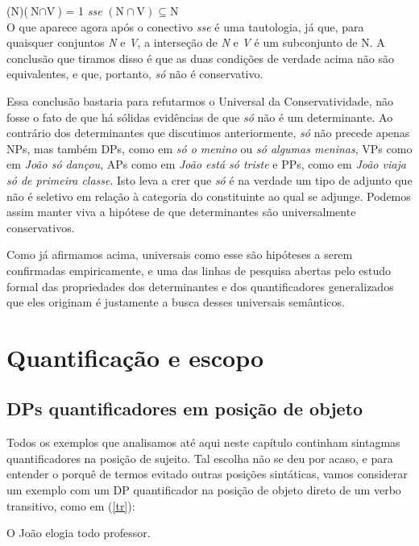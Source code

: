 \n {}(N)($\text{N}\cap\text{V}$) = 1 \textit{sse}
$(\text{N}\cap\text{V})\subseteq\text{N}$\\

\n O que aparece agora após o conectivo \textit{sse} é uma
tautologia, já que, para quaisquer conjuntos \textit{N} e
\textit{V}, a interseção de \textit{N} e \textit{V} é um
subconjunto de N. A conclusão que tiramos disso é que as duas
condições de verdade acima não são equivalentes, e que, portanto,
\textit{só} não é conservativo.

Essa conclusão bastaria para refutarmos o Universal da
Conservatividade, não fosse o fato de que há sólidas evidências de
que \textit{só} não é um determinante. Ao contrário dos
determinantes que discutimos anteriormente, \textit{só} não
precede apenas NPs, mas também DPs, como em \textit{só o menino}
ou \textit{só algumas meninas}, VPs como em \textit{João só
dançou}, APs como em \textit{João está só triste} e PPs, como em
\textit{João viaja só de primeira classe}. Isto leva a crer que \textit{só} é
na verdade um tipo de adjunto que não é seletivo em relação à
categoria do constituinte ao qual se adjunge. Podemos assim manter
viva a hipótese de que determinantes são universalmente
conservativos.

Como já afirmamos acima, universais como esse são hipóteses a serem
confirmadas empiricamente, e uma das linhas de pesquisa abertas
pelo estudo formal das propriedades dos determinantes e dos
quantificadores generalizados que eles originam é justamente a
busca desses universais semânticos.

\section{Quantificação e escopo}

\subsection{DPs quantificadores em posição de objeto}

Todos os exemplos que analisamos até aqui neste capítulo continham
sintagmas quantificadores na posição de sujeito. Tal escolha não
se deu por acaso, e para entender o porquê de termos evitado
outras posições sintáticas, vamos considerar um exemplo com um DP
quantificador na posição de objeto direto de um verbo
transitivo, como em (\ref{tr}):

\begin{exe}
    \ex O João elogia todo professor. \label{tr}
\end{exe}

